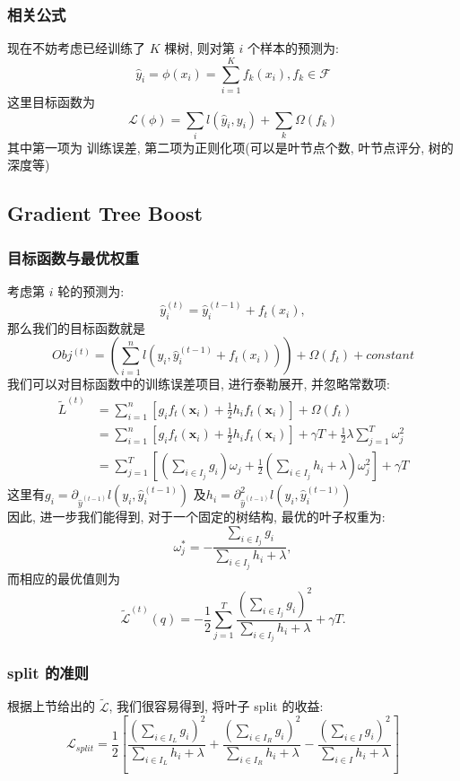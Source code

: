 \documentclass[UTF8]{article}
\begin{document}
\subsubsection{相关公式}
\noindent 现在不妨考虑已经训练了 $K$ 棵树, 则对第 $i$ 个样本的预测为:
$$\hat{y}_i=\phi(x_i)=\sum\limits_{i=1}^Kf_k(x_i), f_k\in\mathcal{F}$$
这里目标函数为
$$\mathcal{L}(\phi)=\sum\limits_{i}l(\hat{y}_i,y_i)+\sum\limits_k\Omega(f_k)$$
其中第一项为 训练误差, 第二项为正则化项(可以是叶节点个数, 叶节点评分, 树的深度等)
\subsection{Gradient Tree Boost}
\subsubsection{目标函数与最优权重}
\noindent 考虑第 $i$ 轮的预测为:
$$\hat{y}_i^{(t)}=\hat{y}_i^{(t-1)}+f_t(x_i),$$
那么我们的目标函数就是
$$Obj^{(t)}=\left(\sum\limits_{i=1}^nl(y_i,\hat{y}_i^{(t-1)}+f_t(x_i))\right)+\Omega(f_t)+constant$$
我们可以对目标函数中的训练误差项目, 进行泰勒展开, 并忽略常数项:
\begin{align*}
    \tilde{L}^{(t)}&=\sum\limits_{i=1}^n [g_if_t(\textbf{x}_i) + \frac{1}{2}h_if_t(\textbf{x}_i)]+\Omega(f_t)\\
    &=\sum\limits_{i=1}^n [g_if_t(\textbf{x}_i) + \frac{1}{2}h_if_t(\textbf{x}_i)]+\gamma T+\frac{1}{2}\lambda\sum\limits_{j=1}^T\omega_j^2\\
    &=\sum\limits_{j=1}^T\left[\left(\sum\limits_{i\in I_j}g_i\right)\omega_j+\frac{1}{2}\left(\sum\limits_{i\in I_j}h_i +\lambda \right)\omega^2_j\right]+\gamma T
\end{align*}
这里有$g_i=\partial_{\hat{y}^{(t-1)}}l(y_i,\hat{y}_i^{(t-1)})$ 及$h_i=\partial^2_{\hat{y}^{(t-1)}}l(y_i,\hat{y}_i^{(t-1)})$\\
因此, 进一步我们能得到, 对于一个固定的树结构, 最优的叶子权重为:
$$\omega^*_j=-\frac{\sum_{i\in I_j}g_i}{\sum_{i\in I_j}h_i+\lambda},$$
而相应的最优值则为
$$\tilde{\mathcal{L}}^{(t)}(q)=-\frac{1}{2}\sum\limits_{j=1}^T\frac{\left(\sum_{i\in I_j}g_i\right)^2}{\sum_{i\in I_j}h_i+\lambda}+\gamma T.$$
\subsubsection{split 的准则}
根据上节给出的 $\tilde{\mathcal{L}}$, 我们很容易得到, 将叶子 split 的收益:
$$\mathcal{L}_{split}=\frac{1}{2}\left[\frac{\left(\sum_{i\in I_L}g_i\right)^2}{\sum_{i\in I_L}h_i+\lambda}+\frac{\left(\sum_{i\in I_R}g_i\right)^2}{\sum_{i\in I_R}h_i+\lambda}-\frac{\left(\sum_{i\in I}g_i\right)^2}{\sum_{i\in I}h_i+\lambda}\right]$$
\end{document}
